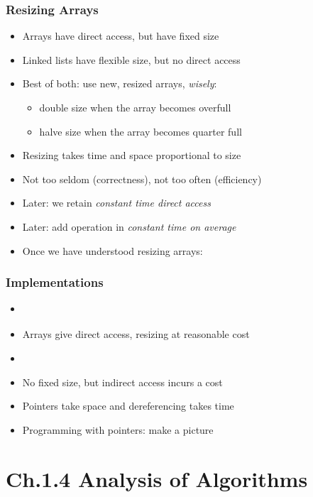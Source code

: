 \documentclass[handout]{beamer}
\newcommand{\git}{https://github.com/marcbezem/INF102/blob/master}
\begin{document}
\frame
  {
    
    \frametitle{Resizing Arrays}

\begin{itemize}[<+->]
\item Arrays have direct access, but have fixed size
\item Linked lists have flexible size, but no direct access
\item Best of both: use new, resized arrays, \emph{wisely}:
  \begin{itemize}[<+->]
  \item double size when the array becomes overfull
  \item halve size when the array becomes quarter full
  \end{itemize}  
\item Resizing takes time and space proportional to size
\item Not too seldom (correctness), not too often (efficiency)
\item Later: we retain \emph{constant time direct access}
\item Later: add operation in \emph{constant time on average}
\item Once we have understood resizing arrays: \href{http://docs.oracle.com/javase/7/docs/api/java/util/ArrayList.html}%
{\color{red}{ArrayList}}
\end{itemize}    
}

\frame
  {
    
    \frametitle{Implementations}

\begin{itemize}[<+->]
\item 
\href{\git/programs/fundamentals/bagsQueuesAndStacks/ResizingArray_Stack.java}%
{\color{red}{ResizingArray\_Stack.java}}
\item Arrays give direct access, resizing at reasonable cost
\item
\href{\git/programs/fundamentals/bagsQueuesAndStacks/LinkedList_Stack.java}%
{\color{red}{LinkedList\_Stack.java}}
\item No fixed size, but indirect access incurs a cost
\item Pointers take space and dereferencing takes time
\item Programming with pointers: make a picture
\end{itemize}    
}

\section{Ch.1.4 Analysis of Algorithms}
\end{document}
